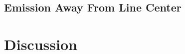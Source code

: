 \documentclass{aastex63}
\begin{document}
\subsection{Emission Away From Line Center}

\section{Discussion}
\end{document}

